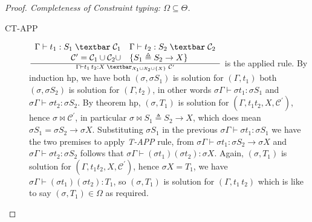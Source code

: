 \documentclass[8pt]{beamer}
\begin{document}
\begin{frame}
\begin{proof}[Proof. Completeness of Constraint typing: 
        $\Omega \subseteq \Theta$]
\begin{description}
            \item[CT-APP] ${{
                        \begin{array}{rl}
                          \Gamma \vdash t_{1}:S_{1} \; \textbar \;
                            \mathcal{C}_1  &
                        \Gamma \vdash  t_{2}:S_{2} \; \textbar \;
                            \mathcal{C}_2  \\
                         \mathcal{C}^{\prime} = \mathcal{C}_1 \cup 
                            \mathcal{C}_2
                            \cup & \{ S_1 \triangleq S_2 \rightarrow X 
                        \} \end{array}}\over
                        {\Gamma \vdash t_{1} \, t_{2} : X\;
                    \textbar_{\mathcal{X}_1 \cup \mathcal{X}_2 \cup
                        \{X\}} \; \mathcal{C}^{\prime} }}$ is the 
                        applied rule. By induction hp, we have both 
                        $(\sigma, \sigma S_1)$ is solution for 
                        $(\Gamma, t_1)$ both $(\sigma, \sigma S_2)$ is 
                        solution for $(\Gamma, t_2)$, in other words 
                        $\sigma \Gamma \vdash \sigma t_1 : \sigma S_1$ 
                        and $\sigma \Gamma \vdash \sigma t_2 : \sigma 
                        S_2$. By theorem hp, $(\sigma,T_1)$ is 
                        solution for $(\Gamma, t_1 t_2, X, 
                        \mathcal{C}^{\prime})$, hence $\sigma \Join 
                        \mathcal{C}^{\prime}$, in particular $\sigma 
                        \Join S_1\triangleq S_2\rightarrow X$, which 
                        does mean $\sigma S_1 = \sigma S_2 \rightarrow 
                        \sigma X$. Substituting $\sigma S_1$ in the 
                        previous $\sigma \Gamma \vdash \sigma t_1 : 
                        \sigma S_1$ we have the two premises to apply 
                        \emph{T-APP} rule, from $\sigma\Gamma \vdash
                        \sigma t_1:\sigma S_2 \rightarrow \sigma X$ 
                        and $\sigma \Gamma \vdash \sigma t_2 :\sigma 
                        S_2$ follows that $\sigma \Gamma \vdash 
                        (\sigma t_1) (\sigma t_2) : \sigma X$. Again, 
                        $(\sigma,T_1)$ is solution for $(\Gamma, t_1 
                        t_2, X, \mathcal{C}^{\prime})$, hence $\sigma 
                        X = T_1$, we have $\sigma \Gamma \vdash 
                        (\sigma t_1) (\sigma t_2) : T_1$, so $(\sigma, 
                        T_1)$ is solution for $(\Gamma, t_1 \, t_2)$
                        which is like to say $(\sigma, T_1)\in\Omega$ 
                        as required.
                
        \end{description}
    \end{proof}
    \normalsize
\end{frame}
\end{document}
